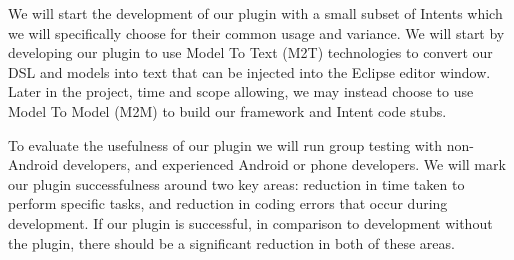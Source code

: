 We will start the development of our plugin with a small subset of Intents which we will specifically choose for their common usage and variance. We will start by developing our plugin to use Model To Text (M2T) technologies to convert our DSL and models into text that can be injected into the Eclipse editor window. Later in the project, time and scope allowing, we may instead choose to use Model To Model (M2M) to build  our framework and Intent code stubs.

To evaluate the usefulness of our plugin we will run group testing with non-Android developers, and experienced Android or phone developers. We will mark our plugin successfulness around two key areas: reduction in time taken to perform specific tasks, and reduction in coding errors that occur during development. If our plugin is successful, in comparison to development without the plugin, there should be a significant reduction in both of these areas.